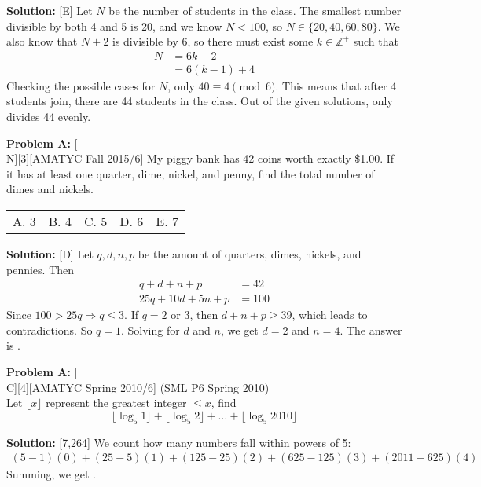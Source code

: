 \documentclass[12pt]{article}
\makeatletter
\newcounter{problem}
\newenvironment{problem}[1]{%
    \stepcounter{problem}
    \noindent\textbf{Problem A\theproblem:} #1
    \\[1em]
}{}
\newcommand{\multChoice}[5]{%
    \begin{tabular}{l @{\hskip 1.5cm} l @{\hskip 1.5cm} l @{\hskip 1.5cm} l @{\hskip 1.5cm} l}
    A. #1 & B. #2 & C. #3 & D. #4 & E. #5
    \end{tabular}
}
\newenvironment{solution}{%
    \vspace{1em}
    \noindent\textbf{Solution:} 
}{}
\makeatother
\begin{document}
\begin{solution}[E]
    Let $N$ be the number of students in the class. The smallest number divisible by both 4 and 5 is 20, and we know $N<100$, so $N \in \{20, 40 , 60 , 80\}$. We also know that $N+2$ is divisible by 6, so there must exist some $k \in \mathbb{Z}^+$ such that
    \begin{align*}
        N &= 6k-2\\
        &=6(k-1)+4
    \end{align*}
    Checking the possible cases for $N$, only $40 \equiv 4 \pmod6$. This means that after 4 students join, there are 44 students in the class. Out of the given solutions, only  divides 44 evenly.
\end{solution}

\vskip 1cm

\begin{problem}[N][3][AMATYC Fall 2015/6]
    My piggy bank has 42 coins worth exactly \$1.00. If it has at least one quarter, dime, nickel, and penny, find the total number of dimes and nickels.
    \multChoice{3}{4}{5}{6}{7}
   \end{problem}


\begin{solution}[D]
    Let $q,d,n,p$ be the amount of quarters, dimes, nickels, and pennies. Then
    \begin{align*}
        q+d+n+p&=42 \\
        25q+10d+5n+p&=100
    \end{align*}
    Since $100>25q \Rightarrow q \leq 3$. If $q=2$ or $3$, then $d+n+p \geq 39$, which leads to contradictions. So $q=1$.
    Solving for $d$ and $n$, we get $d=2$ and $n=4$. The answer is .
\end{solution}

\vskip 1cm

\begin{problem}[C][4][AMATYC Spring 2010/6]
    (SML P6 Spring 2010) \\
    Let $\lfloor x \rfloor$ represent the greatest integer $\leq x$, find 
    $$\lfloor \log_5 1 \rfloor + \lfloor \log_5 2 \rfloor + \ldots + \lfloor \log_5 2010 \rfloor$$
\end{problem}

\begin{solution}[7,264]
    We count how many numbers fall within powers of 5:
    \begin{align*}
        (5-1)(0)+(25-5)(1)+(125-25)(2)+(625-125)(3)+(2011-625)(4)
    \end{align*}
    Summing, we get .
\end{solution}
\end{document}
